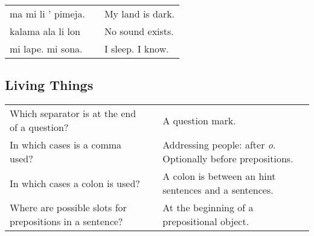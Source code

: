\begin{supertabular}{p{5,5cm}|ll}
    ma mi li ' pimeja. &  & My land is dark. \\
    kalama ala li lon  &  & No sound exists. \\
    mi lape. mi sona.  &  & I sleep. I know. \\
\end{supertabular}

\newpage
%
\subsection*{Living Things}
\label{'living_things'}
%
\begin{supertabular}{p{5,5cm}|ll}
    Which separator is at the end of a question?             &  & A question mark.                                                     \\ %
    In which cases is a comma used?                          &  & Addressing people: after \textit{o}. Optionally before prepositions. \\ %
    In which cases a colon is used?                          &  & A colon is between an hint sentences and a sentences.                \\ %
    Where are possible slots for prepositions in a sentence? &  & At the beginning of a prepositional object.                          \\ %
\end{supertabular}

